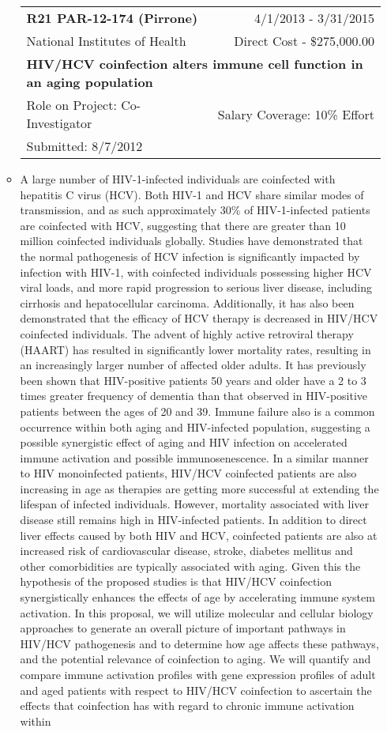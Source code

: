 \documentclass[a4paper,11pt]{article}
\makeatletter
\newenvironment{fullwidth}
    {\par
     \setlength{\@totalleftmargin}{0pt}%
     \setlength{\linewidth}{\hsize}%
     \list{}{\setlength{\leftmargin}{0pt}}
     \item\relax}
    {\endlist}
\makeatother
\begin{document}
\begin{enumerate}
\begin{itemize}
   \begin{longtable}{lr}
    \textbf{R21 PAR-12-174 (Pirrone)} & 4/1/2013 - 3/31/2015 \\
    National Institutes of Health & Direct Cost - \$275,000.00 \\
    \multicolumn{2}{p{0.973\textwidth}}{\bfseries HIV/HCV coinfection alters immune cell function in an aging population } \\
    Role on Project:  Co-Investigator & Salary Coverage: 10\% Effort\\
    Submitted: 8/7/2012\\
    \end{longtable}
   \begin{fullwidth}
    A large number of HIV-1-infected individuals are coinfected with hepatitis C virus (HCV).  Both HIV-1 and HCV share similar modes of transmission, and as such approximately 30\% of HIV-1-infected patients are coinfected with HCV, suggesting that there are greater than 10 million coinfected individuals globally.  Studies have demonstrated that the normal pathogenesis of HCV infection is significantly impacted by infection with HIV-1, with coinfected individuals possessing higher HCV viral loads, and more rapid progression to serious liver disease, including cirrhosis and hepatocellular carcinoma.  Additionally, it has also been demonstrated that the efficacy of HCV therapy is decreased in HIV/HCV coinfected individuals.  The advent of highly active retroviral therapy (HAART) has resulted in significantly lower mortality rates, resulting in an increasingly larger number of affected older adults. It has previously been shown that HIV-positive patients 50 years and older have a 2 to 3 times greater frequency of dementia than that observed in HIV-positive patients between the ages of 20 and 39. Immune failure also is a common occurrence within both aging and HIV-infected population, suggesting a possible synergistic effect of aging and HIV infection on accelerated immune activation and possible immunosenescence. In a similar manner to HIV monoinfected patients, HIV/HCV coinfected patients are also increasing in age as therapies are getting more successful at extending the lifespan of infected individuals.  However, mortality associated with liver disease still remains high in HIV-infected patients.  In addition to direct liver effects caused by both HIV and HCV, coinfected patients are also at increased risk of cardiovascular disease, stroke, diabetes mellitus and other comorbidities are typically associated with aging.  Given this the hypothesis of the proposed studies is that HIV/HCV coinfection synergistically enhances the effects of age by accelerating immune system activation. In this proposal, we will utilize molecular and cellular biology approaches to generate an overall picture of important pathways in HIV/HCV pathogenesis and to determine how age affects these pathways, and the potential relevance of coinfection to aging.  We will quantify and compare immune activation profiles with gene expression profiles of adult and aged patients with respect to HIV/HCV coinfection to ascertain the effects that coinfection has with regard to chronic immune activation within 
\end{fullwidth}
\end{itemize}
\end{enumerate}
\end{document}
